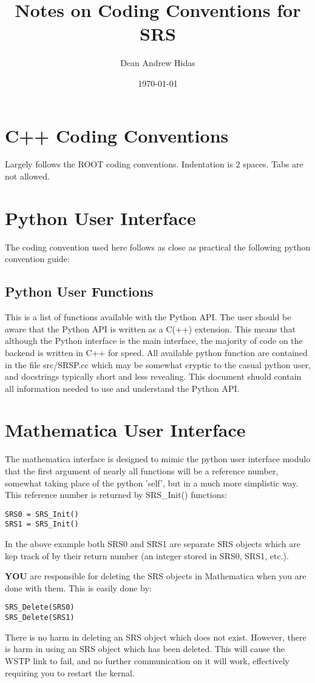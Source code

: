 \documentclass{article}
\title{Notes on Coding Conventions for SRS}
\author{Dean Andrew Hidas}
\date{\today}
\begin{document}
\maketitle

\section{C++ Coding Conventions}
Largely follows the ROOT coding conventions.  Indentation is 2 spaces.  Tabs are not allowed.



\section{Python User Interface}
The coding convention used here follows as close as practical the following python convention guide:

\subsection{Python User Functions}
This is a list of functions available with the Python API.  The user should be aware that the Python API is written as a C(++) extension.  This means that although the Python interface is the main interface, the majority of code on the backend is written in C++ for speed.  All available python function are contained in the file src/SRSP.cc which may be somewhat cryptic to the casual python user, and docstrings typically short and less revealing.  This document shuold contain all information needed to use and understand the Python API.


\section{Mathematica User Interface}
The mathematica interface is designed to mimic the python user interface modulo that the first argument of nearly all functions will be a reference number, somewhat taking place of the python 'self', but in a much more simplistic way.  This reference number is returned by SRS\_Init() functions:
\begin{verbatim}
SRS0 = SRS_Init()
SRS1 = SRS_Init()
\end{verbatim}
In the above example both SRS0 and SRS1 are separate SRS objects which are kep track of by their return number (an integer stored in SRS0, SRS1, etc.).

{\bf YOU} are responsible for deleting the SRS objects in Mathematica when you are done with them.  This is easily done by:
\begin{verbatim}
SRS_Delete(SRS0)
SRS_Delete(SRS1)
\end{verbatim}
There is no harm in deleting an SRS object which does not exist.  However, there is harm in using an SRS object which has been deleted.  This will cause the WSTP link to fail, and no further communication on it will work, effectively requiring you to restart the kernal.
\end{document}

